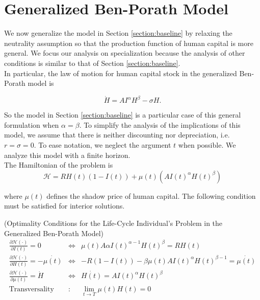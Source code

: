 \section{Generalized Ben-Porath Model} \label{section:generalized}
We now generalize the model in Section \ref{section:baseline} by relaxing the neutrality assumption so that the production function of human capital is more general. We focus our analysis on specialization because the analysis of other conditions is similar to that of Section \ref{section:baseline}. \\

\indent In particular, the law of motion for human capital stock in the generalized Ben-Porath model is

\begin{equation}
\dot{H} = A I^{\alpha} H^{\beta} - \sigma H \label{eq:lawhgen}.
\end{equation}

\noindent So the model in Section \ref{section:baseline} is a particular case of this general formulation when $\alpha = \beta$. To simplify the analysis of the implications of this model, we assume that there is neither discounting nor depreciation, i.e. $r = \sigma = 0$. To ease notation, we neglect the argument $t$ when possible. We analyze this model with a finite horizon.\\
\indent The Hamiltonian of the problem is
\begin{equation}
\mathcal{H} = RH(t) \left(1 - I(t) \right) + \mu(t) \left( A I(t)^{\alpha} H(t)^{\beta} \right)
\end{equation} 

\noindent where $\mu(t)$ defines the shadow price of human capital. The following condition must be satisfied for interior solutions.

\begin{condition} (Optimality Conditions for the Life-Cycle Individual's Problem in the Generalized Ben-Porath Model) \label{condition:optgen}
\begin{eqnarray}
\frac{\partial \mathcal{H} (\cdot)}{\partial I(t)} = 0 &\Leftrightarrow& \mu(t) A \alpha I(t)^{\alpha - 1} H(t)^{\beta} = RH(t) \label{eq:focinvestmentgen} \\
\frac{\partial \mathcal{H} (\cdot)}{\partial H(t)} = - \dot{\mu(t)} &\Leftrightarrow& -R(1 - I(t)) - \beta \mu(t) A I(t)^{\alpha} H(t)^{\beta -1} = \dot{\mu(t)} \label{eq:focstockgen} \\ 
\frac{\partial \mathcal{H} (\cdot)}{\partial \mu(t)} = \dot{H} &\Leftrightarrow& \dot{H(t)} = A I(t)^\alpha H(t)^\beta \label{eq:focmotiongen} \\
\text{Transversality} &:& \lim_{t \rightarrow T} \mu(t) H(t) = 0 \label{eq:foctransversalitygen}
\end{eqnarray}
\end{condition}

